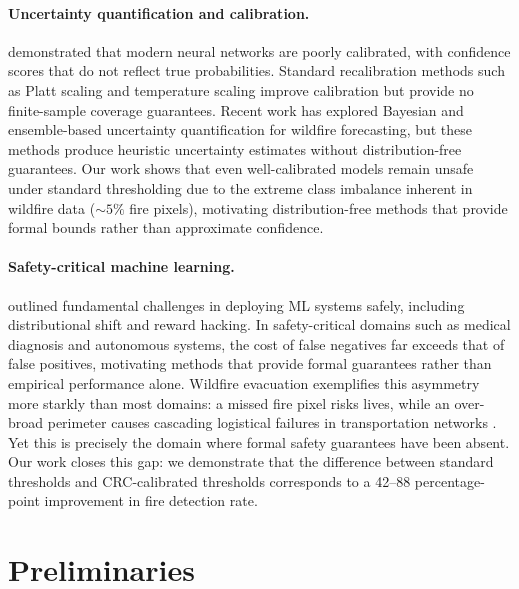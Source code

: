 \documentclass{article}
\begin{document}
\paragraph{Uncertainty quantification and calibration.}
\citet{guo2017calibration} demonstrated that modern neural networks are poorly calibrated, with confidence scores that do not reflect true probabilities.
Standard recalibration methods such as Platt scaling \citep{platt1999probabilistic} and temperature scaling \citep{guo2017calibration} improve calibration but provide no finite-sample coverage guarantees.
Recent work has explored Bayesian and ensemble-based uncertainty quantification for wildfire forecasting, but these methods produce heuristic uncertainty estimates without distribution-free guarantees.
Our work shows that even well-calibrated models remain unsafe under standard thresholding due to the extreme class imbalance inherent in wildfire data (${\sim}5\%$ fire pixels), motivating distribution-free methods that provide formal bounds rather than approximate confidence.

\paragraph{Safety-critical machine learning.}
\citet{amodei2016concrete} outlined fundamental challenges in deploying ML systems safely, including distributional shift and reward hacking.
In safety-critical domains such as medical diagnosis and autonomous systems, the cost of false negatives far exceeds that of false positives, motivating methods that provide formal guarantees rather than empirical performance alone.
Wildfire evacuation exemplifies this asymmetry more starkly than most domains: a missed fire pixel risks lives, while an over-broad perimeter causes cascading logistical failures in transportation networks \citep{zhao2022evacuation}.
Yet this is precisely the domain where formal safety guarantees have been absent.
Our work closes this gap: we demonstrate that the difference between standard thresholds and CRC-calibrated thresholds corresponds to a 42--88 percentage-point improvement in fire detection rate.


\section{Preliminaries}
\label{sec:prelim}
\end{document}
